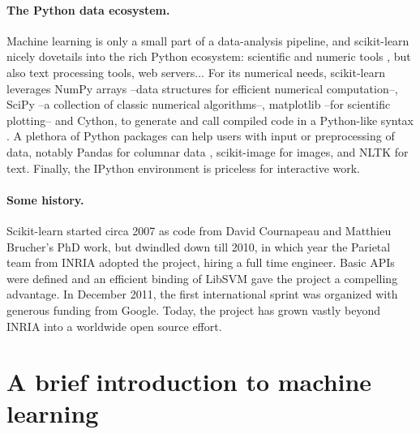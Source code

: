\documentclass[a4paper]{article}
\begin{document}
\paragraph{The Python data ecosystem.}
%
Machine learning is only a small part of a data-analysis pipeline, and
scikit-learn nicely dovetails into the rich Python ecosystem: scientific
and numeric tools \cite{oliphant2007python,varoquaux2013scipy}, but also
text processing tools, web servers...
%
For its numerical needs, scikit-learn leverages NumPy arrays
\cite{vanderwalt2011} --data structures for efficient numerical
computation--, SciPy --a collection of classic numerical algorithms--,
matplotlib \cite{hunter2007matplotlib} --for scientific plotting-- and
Cython, to generate and call compiled code in a Python-like syntax
\cite{behnel2011cython}.
%
A plethora of Python packages can help users with input or preprocessing
of data, notably Pandas for columnar data \cite{mckinney2012}, scikit-image
for images, and NLTK for text. Finally, the IPython environment
\cite{perez2007ipython} is priceless for interactive work.

\paragraph{Some history.}
%
Scikit-learn started circa 2007 as code from David Cournapeau and
Matthieu Brucher's PhD work, but dwindled down till 2010, in which year the
Parietal team from INRIA adopted the project, hiring a full time
engineer. Basic APIs were defined and an efficient binding of LibSVM
\cite{chang2011libsvm} gave the project a compelling advantage. In
December 2011, the first international sprint was organized with generous
funding from Google. Today, the project has grown vastly beyond
INRIA into a worldwide open source effort.

\section{A brief introduction to machine learning}
\end{document}

